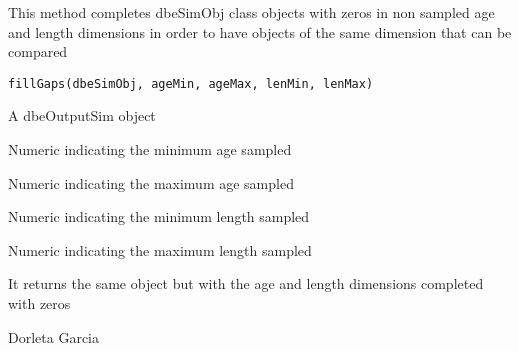 \begin{Description}\relax
This method completes dbeSimObj class objects with zeros in non sampled age and length dimensions 
in order to have objects of the same dimension that can be compared
\end{Description}
\begin{Usage}
\begin{verbatim}
fillGaps(dbeSimObj, ageMin, ageMax, lenMin, lenMax)
\end{verbatim}
\end{Usage}
\begin{Arguments}
\begin{ldescription}
\item[\code{dbeSimObj}] A dbeOutputSim object
\item[\code{ageMin}] Numeric indicating the minimum age sampled
\item[\code{ageMax}] Numeric indicating the maximum age sampled
\item[\code{lenMin}] Numeric indicating the minimum length sampled
\item[\code{lenMax}] Numeric indicating the maximum length sampled
\end{ldescription}
\end{Arguments}
\begin{Value}
It returns the same object but with the age and length dimensions completed with zeros
\end{Value}
\begin{Author}\relax
Dorleta Garcia 
\end{Author}

